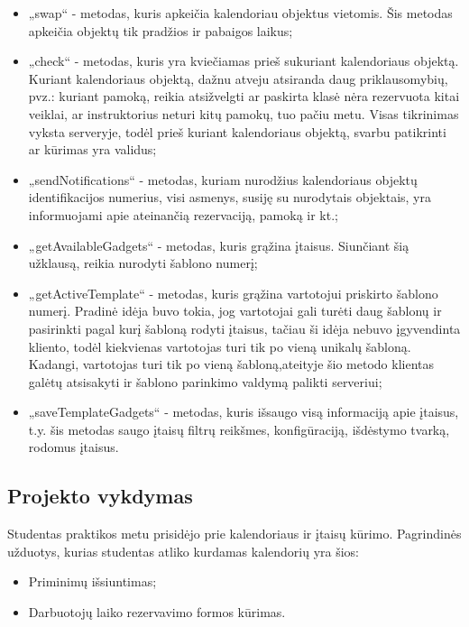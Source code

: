 \documentclass{VUMIFPSbakalaurinis}
\begin{document}
\begin{itemize}
    \item „swap“ - metodas, kuris apkeičia kalendoriau objektus vietomis. Šis metodas apkeičia objektų tik pradžios ir pabaigos laikus;
    \item „check“ - metodas, kuris yra kviečiamas prieš sukuriant kalendoriaus objektą. Kuriant kalendoriaus objektą, dažnu atveju atsiranda daug priklausomybių, pvz.: kuriant pamoką, reikia atsižvelgti ar paskirta klasė nėra rezervuota kitai veiklai, ar instruktorius neturi kitų pamokų, tuo pačiu metu. Visas tikrinimas vyksta serveryje, todėl prieš kuriant kalendoriaus objektą, svarbu patikrinti ar kūrimas yra validus;
    \item „sendNotifications“ - metodas, kuriam nurodžius kalendoriaus objektų identifikacijos numerius, visi asmenys, susiję su nurodytais objektais, yra informuojami apie ateinančią rezervaciją, pamoką ir kt.;
    \item „getAvailableGadgets“ - metodas, kuris grąžina įtaisus. Siunčiant šią užklausą, reikia nurodyti šablono numerį;
    \item „getActiveTemplate“ - metodas, kuris grąžina vartotojui priskirto šablono numerį. Pradinė idėja buvo tokia, jog vartotojai gali turėti daug šablonų ir pasirinkti pagal kurį šabloną rodyti įtaisus, tačiau ši idėja nebuvo įgyvendinta kliento, todėl kiekvienas vartotojas turi tik po vieną unikalų šabloną. Kadangi, vartotojas turi tik po vieną šabloną,ateityje šio metodo klientas galėtų atsisakyti ir šablono parinkimo valdymą palikti serveriui;
    \item 
    „saveTemplateGadgets“ - metodas, kuris išsaugo visą informaciją apie įtaisus, t.y. šis metodas saugo įtaisų filtrų reikšmes, konfigūraciją, išdėstymo tvarką, rodomus įtaisus.
\end{itemize}

\subsection{Projekto vykdymas}

Studentas praktikos metu prisidėjo prie kalendoriaus ir įtaisų kūrimo. Pagrindinės užduotys, kurias studentas atliko kurdamas kalendorių yra šios: 
\begin{itemize}
    \item Priminimų išsiuntimas;
    \item Darbuotojų laiko rezervavimo formos kūrimas.
\end{itemize}
\end{document}
